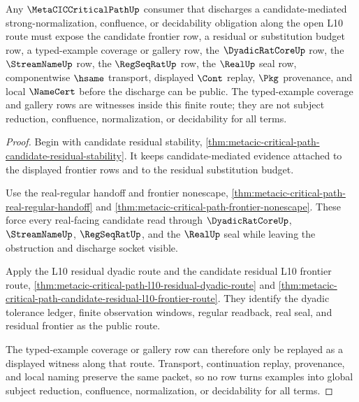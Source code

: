 \begin{theorem}
\label{thm:metaciccriticalpath-l10-candidate-discharge-axis}
Any $\MetaCICCriticalPathUp$ consumer that discharges a candidate-mediated strong-normalization, confluence, or decidability obligation along the open L10 route must expose the candidate frontier row, a residual or substitution budget row, a typed-example coverage or gallery row, the $\DyadicRatCoreUp$ row, the $\StreamNameUp$ row, the $\RegSeqRatUp$ row, the $\RealUp$ seal row, componentwise $\hsame$ transport, displayed $\Cont$ replay, $\Pkg$ provenance, and local $\NameCert$ before the discharge can be public. The typed-example coverage and gallery rows are witnesses inside this finite route; they are not subject reduction, confluence, normalization, or decidability for all terms.
\end{theorem}
\begin{proof}
Begin with candidate residual stability, \autoref{thm:metacic-critical-path-candidate-residual-stability}. It keeps candidate-mediated evidence attached to the displayed frontier rows and to the residual substitution budget.

Use the real-regular handoff and frontier nonescape, \autoref{thm:metacic-critical-path-real-regular-handoff} and \autoref{thm:metacic-critical-path-frontier-nonescape}. These force every real-facing candidate read through $\DyadicRatCoreUp$, $\StreamNameUp$, $\RegSeqRatUp$, and the $\RealUp$ seal while leaving the obstruction and discharge socket visible.

Apply the L10 residual dyadic route and the candidate residual L10 frontier route, \autoref{thm:metacic-critical-path-l10-residual-dyadic-route} and \autoref{thm:metacic-critical-path-candidate-residual-l10-frontier-route}. They identify the dyadic tolerance ledger, finite observation windows, regular readback, real seal, and residual frontier as the public route.

The typed-example coverage or gallery row can therefore only be replayed as a displayed witness along that route. Transport, continuation replay, provenance, and local naming preserve the same packet, so no row turns examples into global subject reduction, confluence, normalization, or decidability for all terms.
\end{proof}
